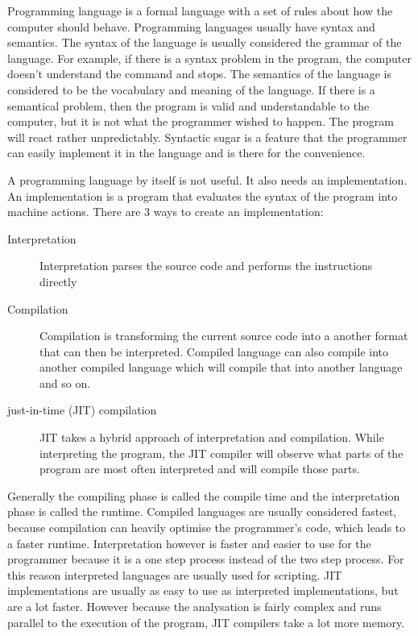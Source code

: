 Programming language is a formal language with a set of rules about how the
computer should behave. Programming languages usually have syntax and semantics.
The syntax of the language is usually considered the grammar of the language.
For example, if there is a syntax problem in the program, the computer doesn't
understand the command and stops. The semantics of the language is considered to
be the vocabulary and meaning of the language. If there is a semantical problem,
then the program is valid and understandable to the computer, but it is not what
the programmer wished to happen. The program will react rather unpredictably.
Syntactic sugar is a feature that the programmer can easily implement it in the
language and is there for the convenience.\cite{website:syntax-semantics}

A programming language by itself is not useful. It also needs an implementation.
An implementation is a program that evaluates the syntax of the program into
machine actions. There are 3 ways to create an implementation:
\begin{description}
  \item[Interpretation] Interpretation parses the source code and performs the
  instructions directly
  \item[Compilation] Compilation is transforming the current source code into a
  another format that can then be interpreted. Compiled language can also
  compile into another compiled language which will compile that into another
  language and so on.
  \item[just-in-time (JIT) compilation] JIT takes a hybrid approach of
  interpretation and compilation. While interpreting the program, the JIT
  compiler will observe what parts of the program are most often interpreted and
  will compile those parts.
\end{description}
Generally the compiling phase is called the compile time and the interpretation
phase is called the runtime. Compiled languages are usually considered fastest,
because compilation can heavily optimise the programmer's code, which leads to
a faster runtime. Interpretation however is faster and easier to use for the
programmer because it is a one step process instead of the two step process. For
this reason interpreted languages are usually used for scripting. JIT
implementations are usually as easy to use as interpreted implementations, but
are a lot faster. However because the analysation is fairly complex and runs
parallel to the execution of the program, JIT compilers take a lot more
memory.\cite{website:jit-memory}

